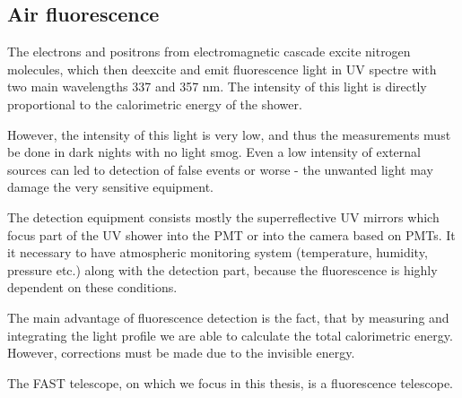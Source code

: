 \subsection{Air fluorescence}
The electrons and positrons from electromagnetic cascade excite nitrogen molecules, which then deexcite and emit fluorescence light in UV spectre with two main wavelengths 337 and 357 nm. The intensity of this light is directly proportional to the calorimetric energy of the shower.
\par
However, the intensity of this light is very low, and thus the measurements must be done in dark nights with no light smog. Even a low intensity of external sources can led to detection of false events or worse - the unwanted light may damage the very sensitive equipment. 
\par
The detection equipment consists mostly the superreflective UV mirrors which focus part of the UV shower into the PMT or into the camera based on PMTs. It it necessary to have atmospheric monitoring system (temperature, humidity, pressure etc.) along with the detection part, because the fluorescence is highly dependent on these conditions.  
\par
The main advantage of fluorescence detection is the fact, that by measuring and integrating the light profile we are able to calculate the total calorimetric energy. However, corrections must be made due to the invisible energy.

\par
The FAST telescope, on which we focus in this thesis, is a fluorescence telescope.
